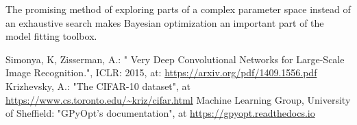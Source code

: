 \documentclass[12pt,fleqn]{article}
\begin{document}
\begin{multicols}{2}
The promising method of exploring parts of a complex parameter space instead of an exhaustive search makes Bayesian optimization an important part of the model fitting toolbox.


\end{multicols}

\begin{thebibliography}{9}
	 Simonya, K, Zisserman, A.: " Very Deep Convolutional Networks for Large-Scale Image Recognition.", ICLR: 2015, at: \url{https://arxiv.org/pdf/1409.1556.pdf}
	 Krizhevsky, A.: "The CIFAR-10 dataset", at \url{https://www.cs.toronto.edu/~kriz/cifar.html}
	 Machine Learning Group, University of Sheffield: "GPyOpt’s documentation", at \url{https://gpyopt.readthedocs.io}
\end{thebibliography}
\end{document}
